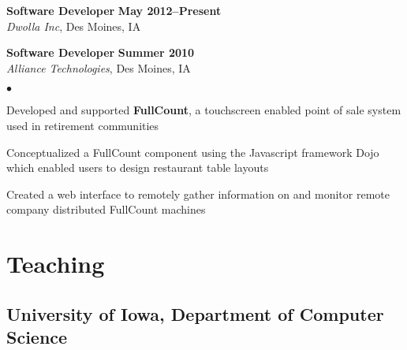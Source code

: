 \documentclass[10pt,letterpaper]{article}
\renewenvironment{itemize}{
  \begin{list}{}{
      \setlength{\leftmargin}{1.5em}
      \setlength{\itemsep}{0.25em}
      \setlength{\parskip}{0pt}
      \setlength{\parsep}{0.25em}
    }
  }{
  \end{list}
}
\newenvironment{bitemize}{
  \begin{list}{$\bullet$}{
      \setlength{\leftmargin}{1.5em}
      \setlength{\itemsep}{0.25em}
      \setlength{\parskip}{0pt}
      \setlength{\parsep}{0.25em}
    }
  }{
  \end{list}
}
\begin{document}
\begin{itemize}
\item \textbf{Software Developer} \hfill \textbf{May 2012--Present}\\
  \textit{Dwolla Inc}, Des Moines, IA

\item \textbf{Software Developer} \hfill \textbf{Summer 2010}\\
  \textit{Alliance Technologies}, Des Moines, IA
  \begin{bitemize}
  \item Developed and supported \textbf{FullCount}, a touchscreen
    enabled point of sale system used in retirement communities
  \item Conceptualized a FullCount component using the Javascript
    framework Dojo which enabled users to design restaurant table
    layouts
  \item Created a web interface to remotely gather information on and
    monitor remote company distributed FullCount machines
  \end{bitemize}

\end{itemize}

\section*{Teaching}

\subsection*{University of Iowa, Department of Computer Science}
\end{document}
